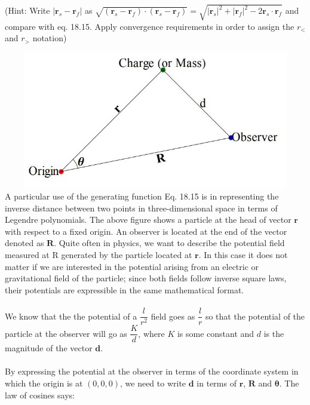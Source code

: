 \documentclass[fleqn]{article}
\begin{document}
\begin{enumerate}
    (Hint: Write $| {\mathbf r}_s -{\mathbf r}_f |$ as $\sqrt{({\mathbf r}_s -{\mathbf r}_f )\cdot ({\mathbf r}_s -{\mathbf r}_f )}=\sqrt{|{\mathbf r}_s|^2 +|{\mathbf r}_f |^2 -2 {\mathbf r}_s \cdot {\mathbf r}_f }$ and compare with eq. 18.15. Apply convergence requirements in order to assign the  $r_{<}$ and  $ r_{>}$ notation) 

    \includegraphics[height=6cm, width=15cm]{legendre.JPG}
    \textcolor{hwColor}{
      A particular use of the generating function Eq. 18.15 is in representing the inverse distance between two points 
      in three-dimensional space in terms of Legendre polynomials. The above figure shows a particle at the head of vector 
      $\mathbf{r}$ with respect to a fixed origin. An observer is located at the end of the vector denoted as $\mathbf{R}$. 
      Quite often in physics, we want to describe the potential field measured at R generated by the particle located 
      at $\mathbf{r}$. In this case it does not matter if we are interested in the potential arising from an electric or
      gravitational field of the particle; since both fields follow inverse square laws, their
      potentials are expressible in the same mathematical format. 
      \\
      \\
      We know that the the potential of a $\dfrac{l}{r^2}$ field goes as $\dfrac{l}{r}$ so that the
      potential of the particle at the observer will go as $\dfrac{K}{d}$, where $K$ is some constant and $d$ is 
      the magnitude of the vector $\mathbf{d}$. \\
      \\
      By expressing the potential at the observer in terms of the coordinate system in which the origin is at $(0,0,0)$, 
      we need to write $\mathbf{d}$ in terms of $\mathbf{r}$, $\mathbf{R}$ and $\mathbf{\theta}$. The law of cosines says: \\
      \\
}
\end{enumerate}
\end{document}
